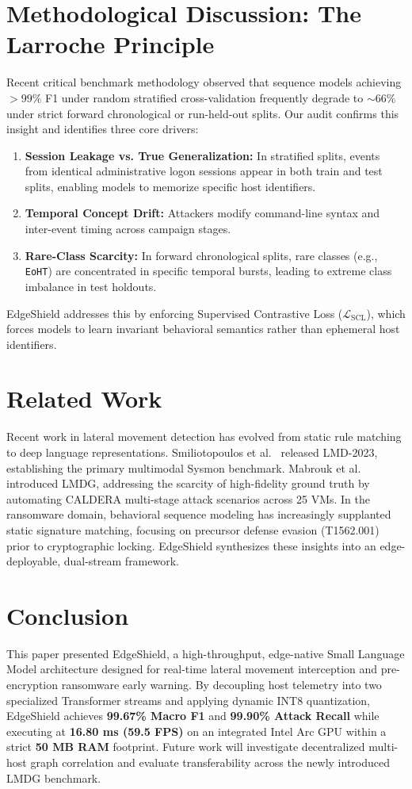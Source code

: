 \documentclass[10pt,journal,compsoc]{IEEEtran}
\begin{document}
\section{Methodological Discussion: The Larroche Principle}
Recent critical benchmark methodology \cite{larroche2026eval} observed that sequence models achieving $>99\%$ F1 under random stratified cross-validation frequently degrade to $\sim 66\%$ under strict forward chronological or run-held-out splits. Our audit confirms this insight and identifies three core drivers:
\begin{enumerate}
    \item \textbf{Session Leakage vs. True Generalization:} In stratified splits, events from identical administrative logon sessions appear in both train and test splits, enabling models to memorize specific host identifiers.
    \item \textbf{Temporal Concept Drift:} Attackers modify command-line syntax and inter-event timing across campaign stages.
    \item \textbf{Rare-Class Scarcity:} In forward chronological splits, rare classes (e.g., \texttt{EoHT}) are concentrated in specific temporal bursts, leading to extreme class imbalance in test holdouts.
\end{enumerate}
EdgeShield addresses this by enforcing Supervised Contrastive Loss ($\mathcal{L}_{\text{SCL}}$), which forces models to learn invariant behavioral semantics rather than ephemeral host identifiers.

\section{Related Work}
Recent work in lateral movement detection has evolved from static rule matching to deep language representations. Smiliotopoulos et al.~\cite{smiliotopoulos2023lmd} released LMD-2023, establishing the primary multimodal Sysmon benchmark. Mabrouk et al.~\cite{mabrouk2025lmdg} introduced LMDG, addressing the scarcity of high-fidelity ground truth by automating CALDERA multi-stage attack scenarios across 25 VMs. In the ransomware domain, behavioral sequence modeling has increasingly supplanted static signature matching, focusing on precursor defense evasion (T1562.001) prior to cryptographic locking. EdgeShield synthesizes these insights into an edge-deployable, dual-stream framework.

\section{Conclusion}
This paper presented EdgeShield, a high-throughput, edge-native Small Language Model architecture designed for real-time lateral movement interception and pre-encryption ransomware early warning. By decoupling host telemetry into two specialized Transformer streams and applying dynamic INT8 quantization, EdgeShield achieves \textbf{99.67\% Macro F1} and \textbf{99.90\% Attack Recall} while executing at \textbf{16.80 ms (59.5 FPS)} on an integrated Intel Arc GPU within a strict \textbf{50 MB RAM} footprint. Future work will investigate decentralized multi-host graph correlation and evaluate transferability across the newly introduced LMDG benchmark.



\end{document}
